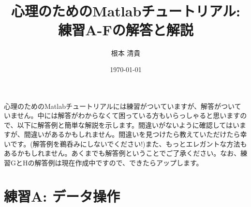 \documentclass{jsarticle}
\begin{document}
\title{心理のためのMatlabチュートリアル: 練習A-Fの解答と解説}
\author{根本 清貴}
\date{\today}
\maketitle
\thispagestyle{empty}

\bigskip

心理のためのMatlabチュートリアルには練習がついていますが、解答がついていません。中には解答がわからなくて困っている方もいらっしゃると思いますので、以下に解答例と簡単な解説を示します。間違いがないように確認してはいますが、間違いがあるかもしれません。間違いを見つけたら教えていただけたら幸いです。(解答例を鵜呑みにしないでください!)また、もっとエレガントな方法もあるかもしれません。あくまでも解答例ということでご了承ください。なお、練習GとHの解答例は現在作成中ですので、できたらアップします。

\section{練習A: データ操作}
\end{document}
